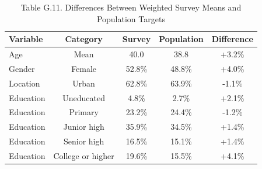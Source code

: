 \begin{table}[!htbp]
\centering
\caption{Table G.11. Differences Between Weighted Survey Means and Population Targets}
\begin{tabular}{lcccc}
\hline
Variable & Category & Survey & Population & Difference \\
\hline
Age & Mean & 40.0 & 38.8 & +3.2\% \\
Gender & Female & 52.8\% & 48.8\% & +4.0\% \\
Location & Urban & 62.8\% & 63.9\% & -1.1\% \\
Education & Uneducated & 4.8\% & 2.7\% & +2.1\% \\
Education & Primary & 23.2\% & 24.4\% & -1.2\% \\
Education & Junior high & 35.9\% & 34.5\% & +1.4\% \\
Education & Senior high & 16.5\% & 15.1\% & +1.4\% \\
Education & College or higher & 19.6\% & 15.5\% & +4.1\% \\
\hline
\end{tabular}
\end{table}
